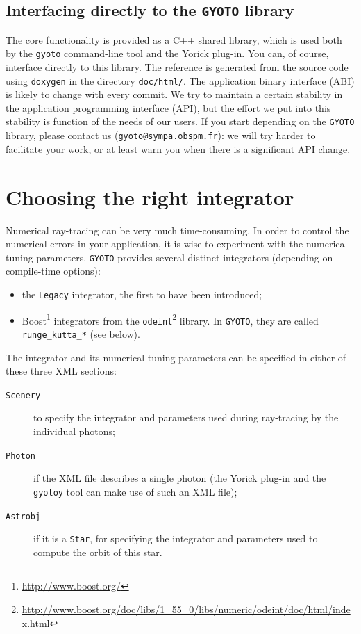 \documentclass[a4paper,12pt]{article}
\begin{document}
\subsection{Interfacing directly to the \texttt{GYOTO} library}

The core functionality is provided as a C++ shared library, which is
used both by the \texttt{gyoto} command-line tool and the Yorick
plug-in. You can, of course, interface directly to this library. The
reference is generated from the source code using \texttt{doxygen} in
the directory \texttt{doc/html/}. The application binary interface
(ABI) is likely to change with every commit. We try to maintain a
certain stability in the application programming interface (API), but
the effort we put into this stability is function of the needs of our
users. If you start depending on the \texttt{GYOTO} library, please
contact us (\texttt{gyoto@sympa.obspm.fr}): we will try harder to
facilitate your work, or at least warn you when there is a significant
API change.

\section{Choosing the right integrator}
\label{tuning}

Numerical ray-tracing can be very much time-consuming. In order to
control the numerical errors in your application, it is wise to
experiment with the numerical tuning parameters. \texttt{GYOTO}
provides several distinct integrators (depending on compile-time
options):
\begin{itemize}
\item the \texttt{Legacy} integrator, the first to have been introduced;
\item Boost\footnote{\url{http://www.boost.org/}} integrators from the
  \texttt{odeint}\footnote{\url{http://www.boost.org/doc/libs/1_55_0/libs/numeric/odeint/doc/html/index.html}}
  library. In \texttt{GYOTO}, they are called
  \texttt{runge\_kutta\_*} (see below).
\end{itemize}

The integrator and its numerical tuning parameters can be specified in
either of these three XML sections:
\begin{description}
\item[\texttt{Scenery}] to specify the integrator and parameters used
  during ray-tracing by the individual photons;
\item[\texttt{Photon}] if the XML file describes a single photon (the
  Yorick plug-in and the \texttt{gyotoy} tool can make use of such an
  XML file);
\item[\texttt{Astrobj}] if it is a \texttt{Star}, for specifying the
  integrator and parameters used to compute the orbit of this star.
\end{description}
\end{document}
